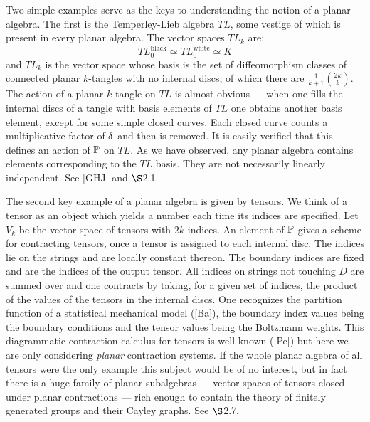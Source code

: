 Two simple examples serve as the keys to
understanding the notion of a planar algebra. The
first is the Temperley-Lieb algebra $TL$, some
vestige of which is present in every planar
algebra. The vector spaces $TL_k$ are:
$$
TL_0^{\text{black}}\simeq
TL_0^{\text{white}}\simeq K
$$
and $TL_k$ is the vector space  whose basis is the
set of diffeomorphism classes of connected planar
$k$-tangles with no internal discs, of which there
are $\frac{1}{k+1}{2k\choose k}$. The
action of a planar $k$-tangle on $TL$ is almost
obvious --- when one fills the internal discs of a
tangle with basis elements of $TL$ one obtains
another basis element, except for some simple
closed curves. Each closed curve counts a
multiplicative factor of $\delta$ and then is removed.
It is easily verified that this defines an action
of $\Bbb P$ on $TL$.
As we have observed, any planar algebra contains
elements corresponding to the $TL$ basis. They are
not necessarily linearly independent. See [GHJ]
and $\S$2.1.

 The second key example of a planar algebra is
given by tensors. We think of a tensor as an
object which yields a number each time its indices
are specified. Let $V_k$ be the vector space of
tensors with $2k$ indices. An element of $\Bbb P$
gives a scheme for contracting tensors, once a
tensor is assigned to each internal disc. The
indices lie on the strings and are locally
constant thereon. The boundary indices are fixed
and are the indices of the output tensor. All
indices  on strings not touching $D$ are summed
over and one contracts by taking, for a given set
of indices, the product of the values of the
tensors in the internal discs. One recognizes the
partition function of a statistical mechanical
model ([Ba]), the boundary index values being the
boundary conditions and the tensor values being
the Boltzmann weights. This diagrammatic
contraction calculus for tensors is well known
([Pe]) but here we are only considering {\it
planar} contraction systems. If the whole planar
algebra of all tensors were the only example this
subject would be of no interest, but in fact there
is a huge family of planar subalgebras --- vector
spaces of tensors closed under planar contractions
--- rich enough to contain the theory of finitely
generated groups and their Cayley graphs. See
$\S$2.7.

